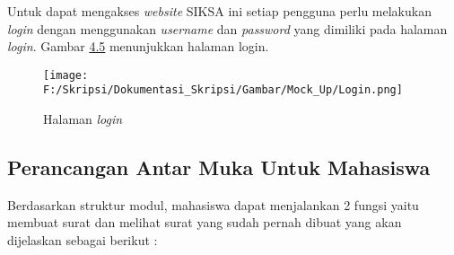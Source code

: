 Untuk dapat mengakses \textit{website} SIKSA ini setiap pengguna perlu melakukan \textit{login} dengan menggunakan \textit{username} dan \textit{password} yang dimiliki pada halaman \textit{login}. Gambar \hyperlink{halaman_login}{4.5} menunjukkan halaman login.
\begin{figure}[H]
	\centering
		\texttt{[image: F:/Skripsi/Dokumentasi\_Skripsi/Gambar/Mock\_Up/Login.png]}
		\caption{Halaman \textit{login}}
		\label{fig:halaman_login}
	\end{figure}

\subsection{Perancangan Antar Muka Untuk Mahasiswa}
\label{sec:perancangan_antar_muka_mahasiswa}
Berdasarkan struktur modul, mahasiswa dapat menjalankan 2 fungsi yaitu membuat surat dan melihat surat yang sudah pernah dibuat yang akan dijelaskan sebagai berikut :

